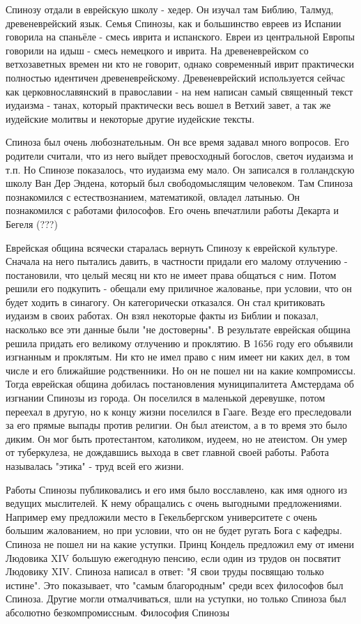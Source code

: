 Спинозу отдали в еврейскую школу - хедер. Он изучал там Библию, Талмуд, древеневрейский язык. Семья Спинозы, как и большинство евреев из Испании говорила на спаньёле - смесь иврита и испанского. Евреи из центральной Европы говорили на идыш - смесь немецкого и иврита. На древеневрейском со ветхозаветных времен ни кто не говорит, однако современный иврит практически полностью идентичен древеневрейскому. Древеневрейский используется сейчас как церковнославянский в православии - на нем написан самый священный текст иудаизма - танах, который практически весь вошел в Ветхий завет, а так же иудейские молитвы и некоторые другие иудейские тексты.

Спиноза был очень любознательным. Он все время задавал много вопросов. Его родители считали, что из него выйдет превосходный богослов, светоч иудаизма и т.п. Но Спинозе показалось, что иудаизма ему мало. Он записался в голландскую школу Ван Дер Эндена, который был свободомыслящим человеком. Там Спиноза познакомился с естествознанием, математикой, овладел латынью. Он познакомился с работами философов. Его очень впечатлили работы Декарта и Бегеля (???)

Еврейская община всячески старалась вернуть Спинозу к еврейской культуре. Сначала на него пытались давить, в частности придали его малому отлучению - постановили, что целый месяц ни кто не имеет права общаться с ним. Потом решили его подкупить - обещали ему приличное жалованье, при условии, что он будет ходить в синагогу. Он категорически отказался. Он стал критиковать иудаизм в своих работах. Он взял некоторые факты из Библии и показал, насколько все эти данные были "не достоверны". В результате еврейская община решила придать его великому отлучению и проклятию. В 1656 году его объявили изгнанным и проклятым. Ни кто не имел право с ним имеет ни каких дел, в том числе и его ближайшие родственники. Но он не пошел ни на какие компромиссы. Тогда еврейская община добилась постановления муниципалитета Амстердама об изгнании Спинозы из города. Он поселился в маленькой деревушке, потом переехал в другую, но к концу жизни поселился в Гааге. Везде его преследовали за его прямые выпады против религии. Он был атеистом, а в то время это было диким. Он мог быть протестантом, католиком, иудеем, но не атеистом. Он умер от туберкулеза, не дождавшись выхода в свет главной своей работы. Работа называлась "этика" - труд всей его жизни.

Работы Спинозы публиковались и его имя было восславлено, как имя одного из ведущих мыслителей. К нему обращались с очень выгодными предложениями. Например ему предложили место в Гекельбергском университете с очень большим жалованием, но при условии, что он не будет ругать Бога с кафедры. Спиноза не пошел ни на какие уступки. Принц Кондель предложил ему от имени Людовика XIV большую ежегодную пенсию, если один из трудов он посвятит Людовику XIV. Спиноза написал в ответ: "Я свои труды посвящаю только истине". Это показывает, что "самым благородным" среди всех философов был Спиноза. Другие могли отмалчиваться, шли на уступки, но только Спиноза был абсолютно безкомпромиссным.
Философия Спинозы

